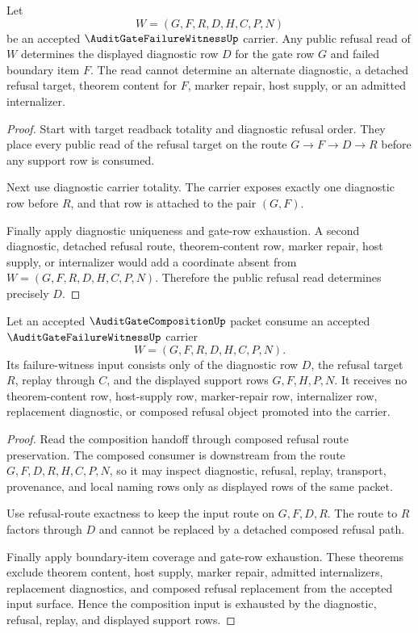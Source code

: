 \begin{theorem}
\label{thm:audit-gate-failure-witness-diagnostic-row-inversion}
Let
$$
W=(G,F,R,D,H,C,P,N)
$$
be an accepted $\AuditGateFailureWitnessUp$ carrier. Any public refusal read of $W$ determines the displayed diagnostic row $D$ for the gate row $G$ and failed boundary item $F$. The read cannot determine an alternate diagnostic, a detached refusal target, theorem content for $F$, marker repair, host supply, or an admitted internalizer.
\end{theorem}
\begin{proof}
Start with target readback totality and diagnostic refusal order. They place every public read of the refusal target on the route $G \to F \to D \to R$ before any support row is consumed.

Next use diagnostic carrier totality. The carrier exposes exactly one diagnostic row before $R$, and that row is attached to the pair $(G,F)$.

Finally apply diagnostic uniqueness and gate-row exhaustion. A second diagnostic, detached refusal route, theorem-content row, marker repair, host supply, or internalizer would add a coordinate absent from $W=(G,F,R,D,H,C,P,N)$. Therefore the public refusal read determines precisely $D$.
\end{proof}

\begin{theorem}
\label{thm:audit-gate-failure-witness-composition-input-exhaustion}
Let an accepted $\AuditGateCompositionUp$ packet consume an accepted $\AuditGateFailureWitnessUp$ carrier
$$
W=(G,F,R,D,H,C,P,N).
$$
Its failure-witness input consists only of the diagnostic row $D$, the refusal target $R$, replay through $C$, and the displayed support rows $G,F,H,P,N$. It receives no theorem-content row, host-supply row, marker-repair row, internalizer row, replacement diagnostic, or composed refusal object promoted into the carrier.
\end{theorem}
\begin{proof}
Read the composition handoff through composed refusal route preservation. The composed consumer is downstream from the route $G,F,D,R,H,C,P,N$, so it may inspect diagnostic, refusal, replay, transport, provenance, and local naming rows only as displayed rows of the same packet.

Use refusal-route exactness to keep the input route on $G,F,D,R$. The route to $R$ factors through $D$ and cannot be replaced by a detached composed refusal path.

Finally apply boundary-item coverage and gate-row exhaustion. These theorems exclude theorem content, host supply, marker repair, admitted internalizers, replacement diagnostics, and composed refusal replacement from the accepted input surface. Hence the composition input is exhausted by the diagnostic, refusal, replay, and displayed support rows.
\end{proof}

